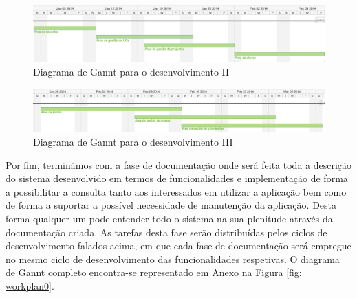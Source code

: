 \begin{figure}[H] 
  \centering
  \includegraphics[width=1\textwidth]{images/plano_de_trabalho/gannt_3.png}
  \caption{Diagrama de Gannt para o desenvolvimento II}
  \label{fig: workplan3}
\end{figure}

\begin{figure}[H] 
  \centering
  \includegraphics[width=1\textwidth]{images/plano_de_trabalho/gannt_4.png}
  \caption{Diagrama de Gannt para o desenvolvimento III}
  \label{fig: workplan4}
\end{figure}

Por fim, terminámos com a fase de documentação onde será feita toda a descrição 
do sistema desenvolvido em termos de funcionalidades e implementação de forma a 
possibilitar a consulta tanto aos interessados em utilizar a aplicação bem como 
de forma a suportar a possível necessidade de manutenção da aplicação. Desta 
forma qualquer um pode entender todo o sistema na sua plenitude através da 
documentação criada. As tarefas desta fase serão distribuídas pelos ciclos de 
desenvolvimento falados acima, em que cada fase de documentação será empregue no 
mesmo ciclo de desenvolvimento das funcionalidades respetivas.
O diagrama de Gannt completo encontra-se representado em Anexo na Figura \ref{fig: 
workplan0}.

